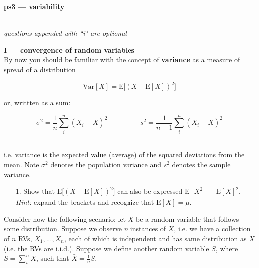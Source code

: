 \documentclass[10pt]{extarticle}
\newcommand{\E}{\text{E}}
\newcommand{\Var}{\text{Var}}
\begin{document}
\setlength{\parindent}{0pt}





{\bf \huge ps3 --- variability}

\hrulefill \\

{\it questions appended with ``i" are optional} \\

\hfill





{\Large \bf I --- convergence of random variables}  \\

By now you should be familiar with the concept of {\bf variance} as a measure of spread of a distribution

$$\Var[X] = \E \big[ (X - \E[X] )^2 \big]$$  

or, writtten as a sum:

$$\sigma^2 = \frac 1n \sum_i^n (X_i - \bar X)^2 \hspace{2cm} s^2 = \frac{1}{n-1} \sum_i^n (X_i - \bar X)^2$$ \ 

i.e. variance is the expected value (average) of the squared deviations from the mean. Note $\sigma^2$ denotes the population variance and $s^2$ denotes the sample variance. 

\hfill 

\begin{itemize}

	\item[1.] Show that $\E \big[ (X - \E[X] )^2 \big]$ can also be expressed $\E[X^2] - \E[X]^2$. {\it Hint:} expand the brackets and recognize that $\E[X] = \mu$.  

\end{itemize} 

\hfill 

Consider now the following scenario: let $X$ be a random variable that follows some distribution. Suppose we observe $n$ instances of $X$, i.e. we have a collection of $n$ RVs, $X_1, ..., X_n$, each of which is independent and has same distribution as $X$ (i.e. the RVs are i.i.d.). Suppose we define another random variable $S$, where $S = \sum_i^n X$, such that $\bar X = \frac 1n S$.  

\hfill 
\end{document}
